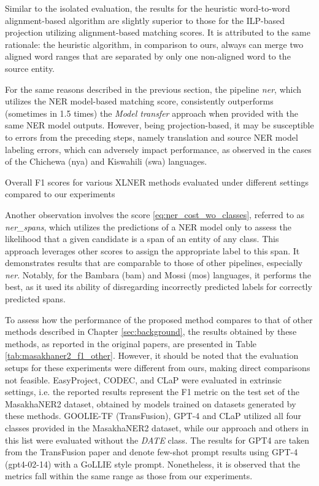 Similar to the isolated evaluation, the results for the heuristic word-to-word
alignment-based algorithm are slightly superior to those for the ILP-based projection
utilizing alignment-based matching scores. It is attributed to the same rationale: the
heuristic algorithm, in comparison to ours, always can merge two aligned word ranges that are separated
by only one non-aligned word to the source entity.

For the same reasons described in the previous section, the pipeline \textit{ner}, which utilizes the NER model-based matching
score, consistently outperforms (sometimes in 1.5 times) the \textit{Model transfer} approach when provided with the same
NER model outputs. However,
being projection-based, it may be susceptible to errors from the preceding steps, namely
translation and source NER model labeling errors, which can adversely impact performance,
as observed in the cases of the Chichewa (nya) and Kiswahili (swa) languages.

\begin{table}[ht]
  
  \caption{Overall F1 scores for various XLNER methods evaluated under different
  settings compared to our experiments}
  \label{tab:masakhaner2_f1_other}
\end{table}

Another observation involves the score \eqref{eq:ner_cost_wo_classes}, referred to as \textit{ner\_spans},
which utilizes the predictions of a NER model only to assess the likelihood
that a given candidate is a span of an entity of any class. This approach
leverages other scores to assign the appropriate label to this span.
It demonstrates results that are comparable to those of other pipelines, especially \textit{ner}.
Notably, for the Bambara (bam) and Mossi (mos) languages, it performs the best, as
it used its ability of disregarding incorrectly predicted labels for correctly predicted spans.

To assess how the performance of the proposed method compares to that of other methods described
in Chapter \ref{sec:background}, the results obtained by these methods, as reported in the original
papers, are presented in Table \ref{tab:masakhaner2_f1_other}. However, it should be noted that the
evaluation setups for these experiments were different from ours, making direct comparisons not feasible.
EasyProject, CODEC, and CLaP were evaluated in extrinsic settings, i.e. the reported results represent the
F1 metric on the test set of the MasakhaNER2 dataset, obtained by models trained on datasets generated
by these methods. GOOLIE-TF (TransFusion), GPT-4 and CLaP utilized all four classes provided in the MasakhaNER2 dataset,
while our approach and others in this list were evaluated without the \textit{DATE} class.
The results for GPT4 are taken from the TransFusion paper \cite{transfusion} and denote few-shot
prompt results using GPT-4 (gpt4-02-14) with a GoLLIE \cite{sainz2024gollieannotationguidelinesimprove} style prompt.
Nonetheless, it is observed that the metrics fall within the same range as those from our experiments.
